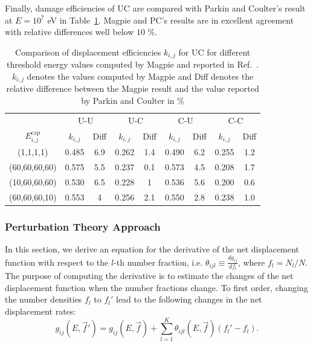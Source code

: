 \documentclass[review]{elsarticle}
\begin{document}
Finally, damage efficiencies of UC are compared with Parkin and Coulter's result at $E=10^{7}$ eV in Table~\ref{tab:UC_kij}. Magpie and PC's results are in excellent agreement with relative differences well below $10$ \%.

\begin{table}[p]
  \centering
  \caption{Comparison of displacement efficiencies $k_{i,j}$ for UC for different threshold energy values computed by Magpie and reported in Ref.~\cite{PC1980}. $k_{i,j}$ denotes the values computed by Magpie and Diff denotes the relative difference between the Magpie result and the value reported by Parkin and Coulter in \% \label{tab:UC_kij}}
\begin{tabular}{c c c c c c c c c}
   & \multicolumn{2}{c}{U-U}& \multicolumn{2}{c}{U-C}&\multicolumn{2}{c}{C-U} & \multicolumn{2}{c}{C-C} \\  
   \cline{2-9}
   $E_{i,j}^{\text{cap}}$ & $k_{i,j}$& Diff  & $k_{i,j}$& Diff & $k_{i,j}$& Diff & $k_{i,j}$& Diff \\ 
\hline
 (1,1,1,1)         & 0.485& 6.9 &   0.262 & 1.4 & 0.490 & 6.2&  0.255 & 1.2\\
 (60,60,60,60) & 0.575 & 5.5 &  0.237  &0.1 & 0.573 &4.5 &  0.208 & 1.7\\
 (10,60,60,60) & 0.530  &6.5 &  0.228  &1 & 0.536 & 5.6 & 0.200&0.6 \\
 (60,60,60,10) & 0.553  &4 &  0.256 &2.1 &  0.550 &2.8 &  0.238& 1.0\\
\hline
\end{tabular}
\end{table}
\clearpage

\subsubsection{Perturbation Theory Approach}
In this section, we derive an equation for the derivative of the net displacement function with respect to the $l$-th number fraction, i.e. $\theta_{ijl} \equiv \frac{d g_{ij}}{d f_l}$, where $f_l = N_l / N$. The purpose of computing the derivative is to estimate the changes of the net displacement function when the number fractions change. To first order, changing the number densities $f_l$ to $f_l'$ lead to the following changes in the net displacement rates:
\begin{equation}\label{eq:first_order_net}
   g_{ij} (E,\vec{f}') =  g_{ij} (E,\vec{f}) + \sum\limits_{l=1}^K \theta_{ijl}(E,\vec{f}) (f_l' - f_l).  
\end{equation}
\end{document}
